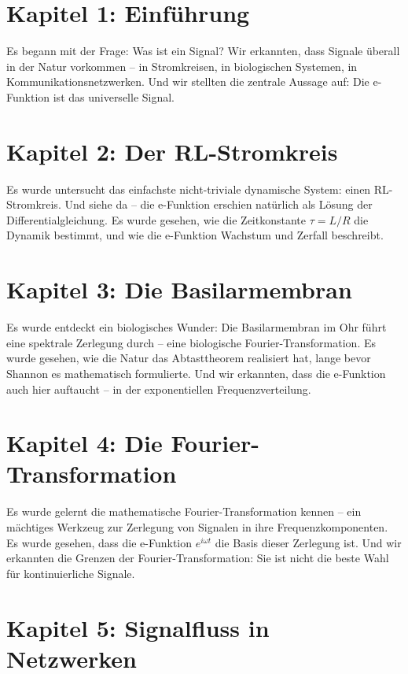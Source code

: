 ﻿\documentclass[a4paper,12pt]{report}
\theoremstyle{definition}
\begin{document}
	\section{Kapitel 1: Einführung}
	
	Es begann mit der Frage: Was ist ein Signal? Wir erkannten, dass Signale überall in der Natur vorkommen -- in Stromkreisen, in biologischen Systemen, in Kommunikationsnetzwerken. Und wir stellten die zentrale Aussage auf: Die e-Funktion ist das universelle Signal.
	
	\section{Kapitel 2: Der RL-Stromkreis}
	
	Es wurde untersucht das einfachste nicht-triviale dynamische System: einen RL-Stromkreis. Und siehe da -- die e-Funktion erschien natürlich als Lösung der Differentialgleichung. Es wurde gesehen, wie die Zeitkonstante $\tau = L/R$ die Dynamik bestimmt, und wie die e-Funktion Wachstum und Zerfall beschreibt.
	
	\section{Kapitel 3: Die Basilarmembran}
	
	Es wurde entdeckt ein biologisches Wunder: Die Basilarmembran im Ohr führt eine spektrale Zerlegung durch -- eine biologische Fourier-Transformation. Es wurde gesehen, wie die Natur das Abtasttheorem realisiert hat, lange bevor Shannon es mathematisch formulierte. Und wir erkannten, dass die e-Funktion auch hier auftaucht -- in der exponentiellen Frequenzverteilung.
	
	\section{Kapitel 4: Die Fourier-Transformation}
	
	Es wurde gelernt die mathematische Fourier-Transformation kennen -- ein mächtiges Werkzeug zur Zerlegung von Signalen in ihre Frequenzkomponenten. Es wurde gesehen, dass die e-Funktion $e^{i\omega t}$ die Basis dieser Zerlegung ist. Und wir erkannten die Grenzen der Fourier-Transformation: Sie ist nicht die beste Wahl für kontinuierliche Signale.
	
	\section{Kapitel 5: Signalfluss in Netzwerken}
	
\end{document}

